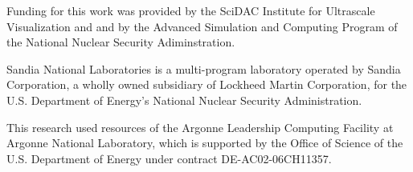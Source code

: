 \documentclass{acm_proc_article-sp}
\begin{document}
Funding for this work was provided by the SciDAC Institute for Ultrascale
Visualization and and by the Advanced Simulation and Computing Program of
the National Nuclear Security Adiminstration.

Sandia National Laboratories is a multi-program laboratory operated by
Sandia Corporation, a wholly owned subsidiary of Lockheed Martin
Corporation, for the U.S. Department of Energy's National Nuclear Security
Administration.

This research used resources of the Argonne Leadership Computing Facility
at Argonne National Laboratory, which is supported by the Office of Science
of the U.S. Department of Energy under contract DE-AC02-06CH11357.



\end{document}
